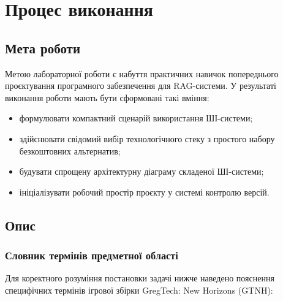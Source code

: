 \chapter{Процес виконання}
\section{Мета роботи}
Метою лабораторної роботи є набуття практичних навичок попереднього проєктування програмного забезпечення для RAG-системи. У результаті виконання роботи мають бути сформовані такі вміння:
\begin{itemize}[wide]
    \item формулювати компактний сценарій використання ШІ-системи;
    \item здійснювати свідомий вибір технологічного стеку з простого набору безкоштовних альтернатив;
    \item будувати спрощену архітектурну діаграму складеної ШІ-системи;
    \item ініціалізувати робочий простір проєкту у системі контролю версій.
\end{itemize}

\section{Опис}

\subsection{Словник термінів предметної області}

Для коректного розуміння постановки задачі нижче наведено пояснення специфічних термінів ігрової збірки GregTech: New Horizons (GTNH):

